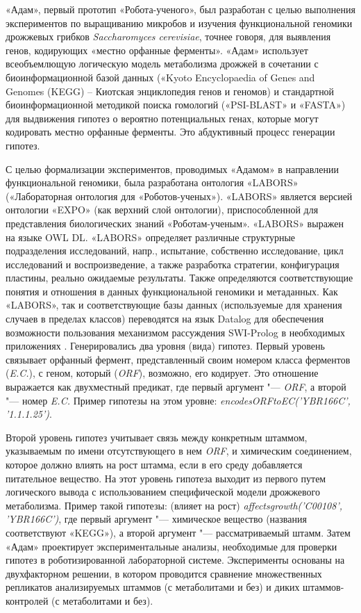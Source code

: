 «Адам», первый прототип «Робота-ученого», был разработан с целью выполнения экспериментов по выращиванию микробов 
и изучения функциональной геномики дрожжевых грибков \textit{Saccharomyces cerevisiae}, точнее говоря, для выявления 
генов, кодирующих «местно орфанные ферменты». «Адам» использует всеобъемлющую логическую модель метаболизма дрожжей в 
сочетании с биоинформационной базой данных («Kyoto Encyclopaedia of Genes and Genomes (KEGG) – Киотская энциклопедия 
генов и геномов) и стандартной биоинформационной методикой поиска гомологий («PSI-BLAST» и «FASTA») для выдвижения 
гипотез о вероятно потенциальных генах, которые могут кодировать местно орфанные ферменты. Это абдуктивный процесс 
генерации гипотез.

С целью формализации экспериментов, проводимых «Адамом» в направлении функциональной геномики, была разработана 
онтология «LABORS» («Лабораторная онтология для «Роботов-ученых»). «LABORS» является версией онтологии «EXPO» (как 
верхний слой онтологии), приспособленной для представления биологических знаний «Роботам-ученым». «LABORS» выражен 
на языке OWL DL. «LABORS» определяет различные структурные подразделения исследований, напр., испытание, собственно 
исследование, цикл исследований и воспроизведение, а также разработка стратегии, конфигурация пластины, реально 
ожидаемые результаты. Также определяются соответствующие понятия и отношения в данных функциональной геномики и 
метаданных. Как «LABORS», так и соответствующие базы данных (используемые для хранения случаев в пределах классов) 
переводятся на язык Datalog для обеспечения возможности пользования механизмом рассуждения SWI-Prolog в необходимых 
приложениях \cite{king2004functional}
.
Генерировались два уровня (вида) гипотез. Первый уровень связывает орфанный фермент, представленный своим номером 
класса ферментов (\textit{E.C.}), с геном, который (\textit{ORF}), возможно, его кодирует. Это отношение выражается 
как двухместный предикат, где первый аргумент "--- \textit{ORF}, а второй "--- номер \textit{E.C.} Пример гипотезы 
на этом уровне: \textit{encodesORFtoEC('YBR166C', '1.1.1.25')}.

Второй уровень гипотез учитывает связь между конкретным штаммом, указываемым по имени отсутствующего в нем \textit{ORF}, 
и химическим соединением, которое должно влиять на рост штамма, если в его среду добавляется питательное вещество. На 
этот уровень гипотеза выходит из первого путем логического вывода с использованием специфической модели дрожжевого 
метаболизма. Пример такой гипотезы: (влияет на рост) \textit{affects\textunderscore growth('C00108', 'YBR166C')}, где 
первый аргумент "--- химическое вещество (названия соответствуют «KEGG»), а второй аргумент "--- рассматриваемый штамм. 
Затем «Адам» проектирует экспериментальные анализы, необходимые для проверки гипотез в роботизированной лабораторной 
системе. Эксперименты основаны на двухфакторном решении, в котором проводится сравнение множественных репликатов 
анализируемых штаммов (с метаболитами и без) и диких штаммов-контролей (с метаболитами и без).

